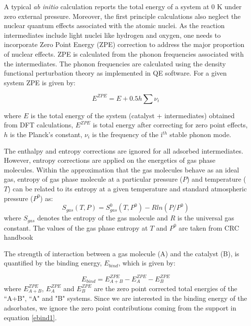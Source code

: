 A typical \textit{ab initio} calculation reports the total energy of a system at 0 K under zero external pressure. Moreover, the first principle calculations also neglect the nuclear quantum effects associated with the atomic nuclei. As the reaction intermediates include light nuclei like hydrogen and oxygen, one needs to incorporate Zero Point Energy (ZPE) correction to address the major proportion of nuclear effects. ZPE is calculated from the phonon frequencies associated with the intermediates. The phonon frequencies are calculated using the density functional perturbation theory as implemented in QE\cite{QE2009} software. For a given system ZPE is given by:


\begin{equation}
 E^{ZPE} = E  + 0.5   h  \sum \nu_{i}
 \label{ZPEC}
\end{equation}

\noindent where $E$ is the total energy of the system (catalyst + intermediates) obtained from DFT
calculations, $E^{ZPE}$ is total energy after correcting for zero point effects, $h$ is the Planck's constant,  $\nu_{i}$ is the frequency of the i$^{th}$ stable phonon mode. 


\noindent The enthalpy and entropy corrections are ignored for all adsorbed intermediates. However, entropy 
corrections are applied on the energetics of gas phase molecules. Within the approximation that the gas 
molecules behave as an ideal gas,
entropy of gas phase molecule at a particular pressure ($P$) and temperature ($T$) can be
related to its entropy at a given temperature and standard atmospheric pressure ($P^0$) as: 
\begin{equation}
 S_{gas} (T,P) = S^{0}_{gas} (T,P^{0}) - R ln (P/P^{0}) 
 \label{des}
\end{equation}
\noindent where $S_{gas}$ denotes the entropy of the gas molecule and $R$ is the universal gas constant.
The values of the gas phase entropy at $T$ and $P^0$ are taken from CRC handbook\cite{lide2004crc}


The strength of interaction between a gas molecule (A) and the catalyst (B), is quantified by the binding
energy, $E_{bind}$, which is given by:

\begin{equation}
E_{bind} = E^{ZPE}_{A+B} - E^{ZPE}_{A} - E^{ZPE}_{B}
 \label{ebind1}
\end{equation}
\noindent where $E^{ZPE}_{A+B}$, $E^{ZPE}_{A}$ and $E^{ZPE}_{B}$ are the zero point corrected total energies of the ``A+B", ``A" and "B" systems. Since we are interested in the binding energy of the adsorbates, we ignore the zero point contributions coming from the support in equation \ref{ebind1}.

